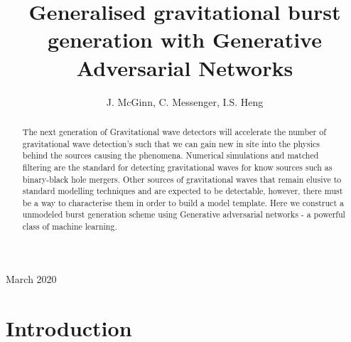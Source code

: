 \documentclass[12pt]{iopart}
\begin{document}
\title{Generalised gravitational burst generation with Generative Adversarial Networks}

\author{J. McGinn, C. Messenger, I.S. Heng}

\address{University of Glasgow, Physics \& Astronomy Department, Glasgow G12 8QQ, UK}
\vspace{10pt}
\begin{indented}
\item[]March 2020
\end{indented}

\begin{abstract}
The next generation of Gravitational wave detectors will accelerate the number of gravitational wave detection's such that we can gain new in site into the physics behind the sources causing the phenomena. Numerical simulations and matched filtering are the standard for detecting gravitational waves for know sources such as binary-black hole mergers. Other sources of gravitational waves that remain elusive to standard modelling techniques and are expected to be detectable, however, there must be a way to characterise them in order to build a model template. Here we construct a unmodeled burst generation scheme using Generative adversarial networks - a powerful class of machine learning. 
\end{abstract}

%
%
%
% 
%



\section{Introduction}

\end{document}
